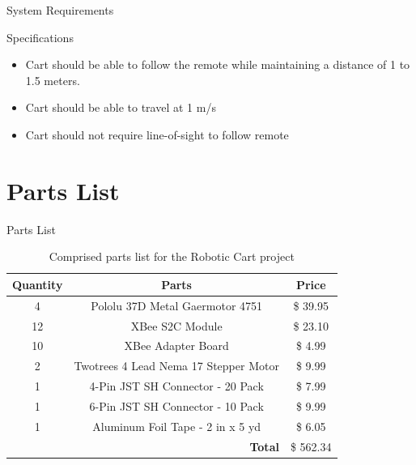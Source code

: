 \documentclass{beamer}
\begin{document}

\begin{frame}{System Requirements}
  \begin{block}{Specifications}
    \begin{itemize}
      \item Cart should be able to follow the remote while maintaining a distance of 1 to 1.5 meters.
      \item Cart should be able to travel at 1 m/s
      \item Cart should not require line-of-sight to follow remote
    \end{itemize}
  \end{block}
\end{frame}


\section{Parts List}

\begin{frame}{Parts List}

  \begin{table}[h!]
      \centering
      \begin{tabular}{c|c|c}
          \toprule
          \textbf{Quantity} & \textbf{Parts} & \textbf{Price}\\
          \toprule
          4 & Pololu 37D Metal Gaermotor 4751 & \$ 39.95\\
          12 & XBee S2C Module & \$ 23.10\\
          10 & XBee Adapter Board & \$ 4.99\\
          2 & Twotrees 4 Lead Nema 17 Stepper Motor & \$ 9.99\\
          1 & 4-Pin JST SH Connector - 20 Pack & \$ 7.99\\
          1 & 6-Pin JST SH Connector - 10 Pack & \$ 9.99\\
          1 & Aluminum Foil Tape - 2 in x 5 yd & \$ 6.05\\
          \bottomrule
          \multicolumn{2}{r|}{\textbf{Total}} & \$ 562.34\\
          \bottomrule
      \end{tabular}
      \caption{Comprised parts list for the Robotic Cart project}
      \label{tab:Partslist}
  \end{table}

\end{frame}
\end{document}
